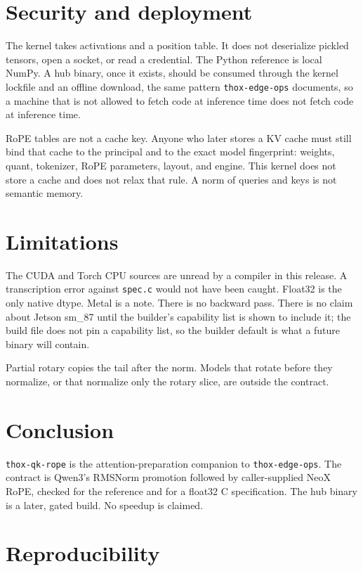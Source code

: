 \documentclass[11pt]{article}
\begin{document}
\section{Security and deployment}

The kernel takes activations and a position table. It does not deserialize pickled tensors, open a socket, or read a credential. The Python reference is local NumPy. A hub binary, once it exists, should be consumed through the kernel lockfile and an offline download, the same pattern \texttt{thox-edge-ops} documents, so a machine that is not allowed to fetch code at inference time does not fetch code at inference time.

RoPE tables are not a cache key. Anyone who later stores a KV cache must still bind that cache to the principal and to the exact model fingerprint: weights, quant, tokenizer, RoPE parameters, layout, and engine. This kernel does not store a cache and does not relax that rule. A norm of queries and keys is not semantic memory.

\section{Limitations}

The CUDA and Torch CPU sources are unread by a compiler in this release. A transcription error against \texttt{spec.c} would not have been caught. Float32 is the only native dtype. Metal is a note. There is no backward pass. There is no claim about Jetson sm\_87 until the builder's capability list is shown to include it; the build file does not pin a capability list, so the builder default is what a future binary will contain.

Partial rotary copies the tail after the norm. Models that rotate before they normalize, or that normalize only the rotary slice, are outside the contract.

\section{Conclusion}

\texttt{thox-qk-rope} is the attention-preparation companion to \texttt{thox-edge-ops}. The contract is Qwen3's RMSNorm promotion followed by caller-supplied NeoX RoPE, checked for the reference and for a float32 C specification. The hub binary is a later, gated build. No speedup is claimed.

\section*{Reproducibility}
\end{document}
